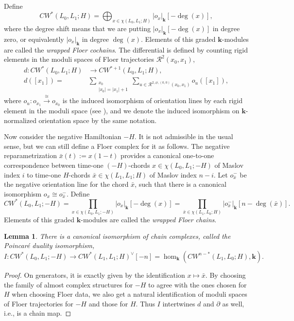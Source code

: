 \documentclass[11pt]{amsproc}
\def\K{{\mathbf{k}}}
\def\cR{\mathcal{R}}
\def\p{\partial}
\newtheorem{lem}{Lemma}[section]
\theoremstyle{remark}
\numberwithin{equation}{section}
\begin{document}
Define
\begin{equation}\label{Floer cochains}
CW^{*}(L_{0}, L_{1}; H) = \bigoplus_{x \in \chi(L_{0}, L_{1}; H)} |o_x|_{\K}[-\deg(x)],
\end{equation}
where the degree shift means that we are putting $|o_x|_{\K}[-\deg(x)]$ in degree zero, 
or equivalently $|o_x|_{\K}$ in degree $\deg(x)$.
Elements of this graded $\K$-modules are called the {\it wrapped Floer cochains}.
The differential is defined by counting rigid elements in the moduli spaces of Floer trajectories $\cR^{2}(x_{0}, x_{1})$, 
\begin{align}
d:  CW^{*}(L_{0}, L_{1}; H) & \to CW^{*+1}(L_{0}, L_{1}; H),\\
d([x_{1}])  = & \sum_{\substack{x_{0}\\|x_{0}|=|x_{1}|+1}} \sum_{u \in \cR^{2, \varnothing, (0, 0)}(x_{0}, x_{1})} o_{u}([x_{1}]),
\end{align}
where $o_{u}: o_{x_{1}} \stackrel{\cong}\to o_{x_{0}}$ is the induced isomorphism of orientation lines by each rigid element in the moduli space (see \cites{seidel_book, abouzaid_gc}),
and we denote the induced isomorphism on $\K$-normalized orientation space by the same notation.

Now consider the negative Hamiltonian $-H$.
It is not admissible in the usual sense, but we can still define a Floer complex for it as follows.
The negative reparametrization $\bar{x}(t):=x(1-t)$ provides a canonical one-to-one correspondence between time-one $(-H)$-chords $x \in \chi(L_{0}, L_{1}; -H)$ of Maslov index $i$ to time-one $H$-chords $\bar{x} \in \chi(L_{1}, L_{1}; H)$ of Maslov index $n-i$.
Let $o^{-}_{\bar{x}}$ be the negative orientation line for the chord $\bar{x}$,
such that there is a canonical isomorphism $o_{x} \cong o^{-}_{\bar{x}}$.
Define
\begin{equation}\label{Floer chains}
CW^{*}(L_{0}, L_{1}; -H) = \prod_{x \in \chi(L_{0}, L_{1}; -H)} |o_{x}|_{\K}[-\deg(x)] = \prod_{\bar{x} \in \chi(L_{1}, L_{0}; H)} |o^{-}_{\bar{x}}|_{\K}[n-\deg(\bar{x})].
\end{equation}
Elements of this graded $\K$-modules are called the {\it wrapped Floer chains}.

\begin{lem}\label{lem: PD for w-}
There is a canonical isomorphism of chain complexes, called the Poincar\'{e} duality isomorphism,
\begin{equation}\label{PD for w-}
I: CW^{*}(L_{0}, L_{1}; -H) \to CW^{*}(L_{1}, L_{1}; H)^{\vee}[-n] = \hom_{\K}(CW^{n-*}(L_{1}, L_{0}; H), \K).
\end{equation}
\end{lem}
\begin{proof}
On generators, it is exactly given by the identification $x \mapsto \bar{x}$.
By choosing the family of almost complex structures for $-H$ to agree with the ones chosen for $H$ when choosing Floer data,
we also get a natural identification of moduli spaces of Floer trajectories for $-H$ and those for $H$.
Thus $I$ intertwines $d$ and $\p$ as well, i.e., is a chain map.
\end{proof}
\end{document}
